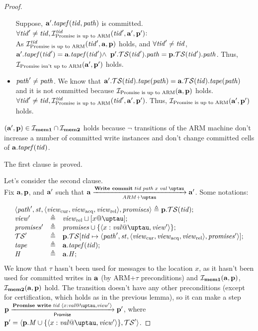\begin{proof}
\begin{itemize}
    Suppose, $\mathbf{a}'.\mathit{tapef}(\mathit{tid}, \mathit{path})$ is committed.\\
    $\forall \mathit{tid}' \not = \mathit{tid}, \mathcal{I}^{\mathit{tid}}_{\textup{Promise is up to ARM}}(\mathit{tid}', \mathbf{a}', \mathbf{p}')$: \\
      As $\mathcal{I}^{\mathit{tid}}_{\textup{Promise is up to ARM}}(\mathit{tid}', \mathbf{a}, \mathbf{p})$ holds,
      and $\forall \mathit{tid}' \not = \mathit{tid}$, $\mathbf{a}'.\mathit{tapef}(\mathit{tid}') = \mathbf{a}.\mathit{tapef}(\mathit{tid}') \land$
          $\mathbf{p}'.\mathcal{TS}(\mathit{tid}').\mathit{path} = \mathbf{p}.\mathcal{TS}(\mathit{tid}').\mathit{path}$.
    Thus, $\mathcal{I}_{\textup{\rm Promise isn't up to ARM}}(\mathbf{a}', \mathbf{p}')$ holds.
  \item $\mathit{path}' \not = \mathit{path}$.
    We know that $\mathbf{a}'.\mathcal{TS}(\mathit{tid}).\mathit{tape}(\mathit{path}) = \mathbf{a}.\mathcal{TS}(\mathit{tid}).\mathit{tape}(\mathit{path})$ and it is not committed
    because $\mathcal{I}_{\textup{\rm Promise is up to ARM}}(\mathbf{a}, \mathbf{p})$ holds.
    $\forall \mathit{tid}' \not = \mathit{tid}, \mathcal{I}^{\mathit{tid}}_{\textup{Promise is up to ARM}}(\mathit{tid}', \mathbf{a}', \mathbf{p}')$.
    Thus, $\mathcal{I}_{\textup{\rm Promise is up to ARM}}(\mathbf{a}', \mathbf{p}')$ holds.
\end{itemize}

$(\mathbf{a}', \mathbf{p}) \in \mathcal{I}_{\rm \bf mem1} \cap \mathcal{I}_{\rm \bf mem2}$ holds because
  $\lnot$  transitions of the ARM machine don't increase a number of committed write instances and
  don't change committed cells of $\mathbf{a}.\mathit{tapef}(\mathit{tid})$.
  
The first clause is proved.

  Let's consider the second clause. \\
  Fix $\mathbf{a}, \mathbf{p}$, and $\mathbf{a}'$ such that $\aT \armStepWriteCommit \aT'$.
  Some notations:
\[
\begin{array}{l l l}
\multicolumn{3}{l}{\angled{\cpath', \PromState, \angled{\Rcur, \Racq, \Rrel}, \PromSet} \triangleq \p.\TSfprom(\tId);}\\
\R' & \triangleq & \Rrel \sqcup [x @ \tau]; \\
\PromSet' & \triangleq & \PromSet \cup \{\writeEvt{x}{\stval}{\tau}{\R'}\}; \\
\TSfprom' & \triangleq & \p.\TSfprom[\tId \mapsto \angled{\cpath', \PromState, \angled{\Rcur, \Racq, \Rrel}, \PromSet'}]; \\
\tape     & \triangleq & \aT.\tapef(\tId); \\
\hmap     & \triangleq & \aT.\hmap; \\
\end{array}
\]
We know that $\tau$ hasn't been used for messages to the location $x$, as
it hasn't been used for committed writes in $\mathbf{a}$
(by ARM+$\tau$  preconditions)
and $\mathcal{I}_{\rm \bf mem1}(\mathbf{a}, \mathbf{p})$, $\mathcal{I}_{\rm \bf mem2}(\mathbf{a}, \mathbf{p})$ hold.
The  transition doesn't have any other preconditions
(except for certification, which holds as in the previous lemma), so
it can make a step $\p \promStepPromiseRPrime \p'$,
where $\p' = \angled{\p.\Mprom \cup \{\writeEvt{x}{\stval}{\tau}{\R'}\}, \TSfprom'}$.


\end{proof}

